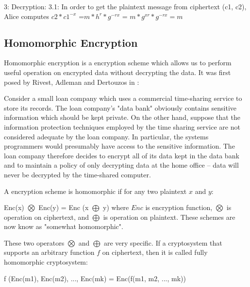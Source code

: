       3: Decryption: 
         3.1: In order to get the plaintext message from ciphertext (c1, c2), Alice computes  $c2 * c1^{-x} $
          =$ m * h ^ {r} * g^{-rx} $ = $ m * g ^ {xr} * g^{-rx} = m $
     
     
    
    \subsection{Homomorphic Encryption}
	     Homomorphic encryption  is a encryption scheme which allows us to perform useful operation on 
	     encrypted data without decrypting the data. It was first posed by Rivest, Adleman and Dertouzos in \citep{rivest1978data}: 
	     \begin{displayquote}
	     
	     Consider a small loan company which uses a commercial time-sharing service to store its records.  
	     The loan company’s "data bank" obviously contains sensitive information which should be kept private.  
	     On the other hand, suppose that the information protection techniques employed by the time sharing 
	     service are not considered adequate by the loan company.  In particular, the systems programmers would 
	     presumably have access to the sensitive information.  The loan company therefore decides to encrypt all 
	     of its data kept in the data bank and to maintain a policy of only decrypting data at the home office -- data 
	     will never be decrypted by the time-shared computer.
	     
	     \end{displayquote}  
	     
		A encryption scheme is homomorphic if for any two plaintext $x$ and $y$:
		\begin{displayquote}
		
		Enc(x) $\bigotimes$ Enc(y) = Enc (x $\bigoplus$ y) where 
		$Enc$ is encryption function, $\bigotimes$ is operation on ciphertext, and $\bigoplus$
		is operation on plaintext. These schemes are now know as "somewhat homomorphic". 
		
		\end{displayquote}
				
		These two operators $\bigotimes$ and $\bigoplus$ are very specific. If a cryptosystem that supports an arbitrary 
		function $f$ on ciphertext, then it is called fully homomorphic cryptosystem:
		\begin{displayquote}
		f (Enc(m1), Enc(m2), ..., Enc(mk) = Enc(f(m1, m2, ..., mk)) 
	    \end{displayquote}
		
